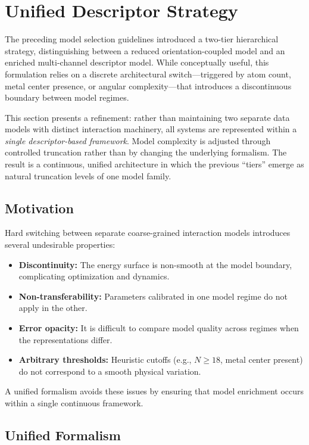 \documentclass[11pt]{article}
\begin{document}
\section{Unified Descriptor Strategy}

The preceding model selection guidelines introduced a two-tier hierarchical strategy, distinguishing between a reduced orientation-coupled model and an enriched multi-channel descriptor model. While conceptually useful, this formulation relies on a discrete architectural switch---triggered by atom count, metal center presence, or angular complexity---that introduces a discontinuous boundary between model regimes.

This section presents a refinement: rather than maintaining two separate data models with distinct interaction machinery, all systems are represented within a \emph{single descriptor-based framework}. Model complexity is adjusted through controlled truncation rather than by changing the underlying formalism. The result is a continuous, unified architecture in which the previous ``tiers'' emerge as natural truncation levels of one model family.

\subsection{Motivation}

Hard switching between separate coarse-grained interaction models introduces several undesirable properties:

\begin{itemize}
    \item \textbf{Discontinuity:} The energy surface is non-smooth at the model boundary, complicating optimization and dynamics.
    \item \textbf{Non-transferability:} Parameters calibrated in one model regime do not apply in the other.
    \item \textbf{Error opacity:} It is difficult to compare model quality across regimes when the representations differ.
    \item \textbf{Arbitrary thresholds:} Heuristic cutoffs (e.g., $N \geq 18$, metal center present) do not correspond to a smooth physical variation.
\end{itemize}

A unified formalism avoids these issues by ensuring that model enrichment occurs within a single continuous framework.

\subsection{Unified Formalism}
\end{document}
